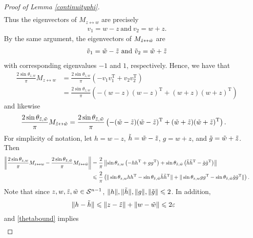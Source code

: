 \documentclass[11pt]{article}
\renewcommand{\epsilon}{\varepsilon}
\renewcommand{\top}{{\mathrm{T}}}
\theoremstyle{remark}
\begin{document}
\begin{proof}[Proof of Lemma \ref{continuityphi}]
\begin{align*}
\end{align*} Thus the eigenvectors of $M_{z\leftrightarrow w}$ are precisely \begin{align*}
    v_1 = w - z\ \text{and}\ v_2 = w + z.
\end{align*} By the same argument, the eigenvectors of $M_{\Tilde{z} \leftrightarrow \Tilde{w}}$ are \begin{align*}
    \Tilde{v}_1 = \Tilde{w} - \Tilde{z}\ \text{and}\ \tilde{v}_2 = \Tilde{w} + \Tilde{z}
\end{align*} with corresponding eigenvalues $-1$ and $1$, respectively. Hence, we have that \begin{align*}
    \frac{2\sin \theta_{z, w}}{\pi}M_{z \leftrightarrow w} & = \frac{2\sin \theta_{z, w}}{\pi}\left(-v_1v_1^\top + v_2v_2^\top\right) \\
    & = \frac{2\sin \theta_{z, w}}{\pi}\left(-(w-z)(w-z)^\top + (w+z)(w+z)^\top\right)
\end{align*} and likewise \begin{align*}
    \frac{2\sin \theta_{\Tilde{z},\Tilde{w}}}{\pi}M_{\Tilde{z} \leftrightarrow \Tilde{w}} & = \frac{2\sin \theta_{\Tilde{z},\Tilde{w}}}{\pi}\left(-(\Tilde{w} - \Tilde{z})(\Tilde{w}-\Tilde{z})^\top + (\Tilde{w} + \Tilde{z})(\Tilde{w} + \Tilde{z})^\top\right).
\end{align*} For simplicity of notation, let $h = w - z$, $\Tilde{h} = \tilde{w} - \Tilde{z}$, $g = w + z$, and $\Tilde{g} = \tilde{w} + \Tilde{z}$. Then \begin{align*}
    \left\|\frac{2\sin \theta_{z, w}}{\pi}M_{z \leftrightarrow w} -  \frac{2\sin \theta_{\Tilde{z}, \Tilde{w}}}{\pi}M_{\Tilde{z} \leftrightarrow \Tilde{w}}\right\| & = \frac{2}{\pi}\left\|\sin \theta_{z, w}\left(-hh^\top + gg^\top\right) + \sin \theta_{\Tilde{z}, \Tilde{w}}\left(\Tilde{h}\Tilde{h}^\top - \Tilde{g}\Tilde{g}^\top\right) \right\| \\
    & \leqslant \frac{2}{\pi}\left(\| \sin \theta_{z, w}hh^\top - \sin \theta_{\Tilde{z}, \Tilde{w}}\Tilde{h}\Tilde{h}^\top \| + \|\sin \theta_{z, w}gg^\top - \sin \theta_{\Tilde{z}, \Tilde{w}}\tilde{g}\Tilde{g}^\top \|\right).
\end{align*} Note that since $z,w,\Tilde{z},\Tilde{w} \in \mathcal{S}^{n-1}$, $\|h\|,\|\Tilde{h}\|,\|g\|,\|\Tilde{g}\| \leqslant 2$. In addition, \begin{align*}
    \|h-\Tilde{h}\| & \leqslant \|z - \tilde{z}\| + \|w - \Tilde{w}\| \leqslant 2\epsilon
\end{align*} and \eqref{thetabound} implies \begin{align*}

\end{align*}
\end{proof}
\end{document}
